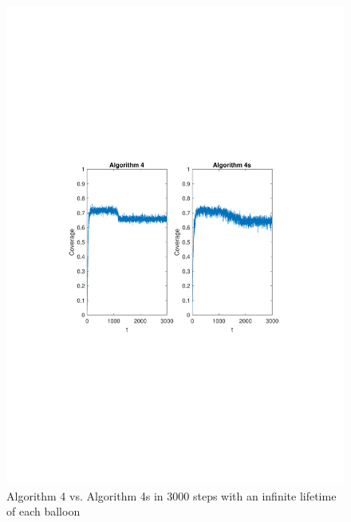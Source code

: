 \begin{figure}[H]
\centering
\includegraphics[scale=0.7, trim={3cm 10cm 4cm 9cm},clip]{graphics/coverage_alg4_vs_alg4s_3000_LONG.pdf}
\caption{Algorithm 4 vs. Algorithm 4s in 3000 steps with an infinite lifetime of each balloon}
\label{fig:alg4vsalg4s_long}
\end{figure}

